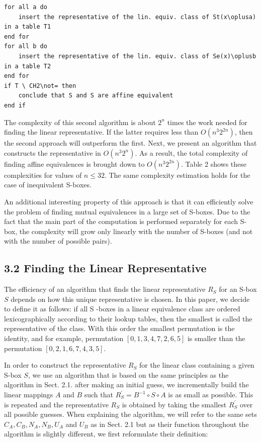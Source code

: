 \documentclass[10pt]{article}
\begin{document}
\begin{verbatim}
for all a do
    insert the representative of the lin. equiv. class of St(x\oplusa) in a table T1
end for
for all b do
    insert the representative of the lin. equiv. class of Se(x)\oplusb in a table T2
end for
if T \ CH2\not= then
    conclude that S and S are affine equivalent
end if
\end{verbatim}

The complexity of this second algorithm is about $2^{n}$ times the work needed for finding the linear representative. If the latter requires less than $O\left(n^{3} 2^{2 n}\right)$, then the second approach will outperform the first. Next, we present an algorithm that constructs the representative in $O\left(n^{3} 2^{n}\right)$. As a result, the total complexity of finding affine equivalences is brought down to $O\left(n^{3} 2^{2 n}\right)$. Table 2 shows these complexities for values of $n \leq 32$. The same complexity estimation holds for the case of inequivalent S-boxes.

An additional interesting property of this approach is that it can efficiently solve the problem of finding mutual equivalences in a large set of S-boxes. Due to the fact that the main part of the computation is performed separately for each S-box, the complexity will grow only linearly with the number of S-boxes (and not with the number of possible pairs).

\subsection*{3.2 Finding the Linear Representative}
The efficiency of an algorithm that finds the linear representative $R_{S}$ for an S-box $S$ depends on how this unique representative is chosen. In this paper, we decide to define it as follows: if all S -boxes in a linear equivalence class are ordered lexicographically according to their lookup tables, then the smallest is called the representative of the class. With this order the smallest permutation is the identity, and for example, permutation $[0,1,3,4,7,2,6,5]$ is smaller than the permutation $[0,2,1,6,7,4,3,5]$.

In order to construct the representative $R_{S}$ for the linear class containing a given S-box $S$, we use an algorithm that is based on the same principles as the algorithm in Sect. 2.1. after making an initial guess, we incrementally build the linear mappings $A$ and $B$ such that $R_{S}^{\prime}=B^{-1} \circ S \circ A$ is as small as possible. This is repeated and the representative $R_{S}$ is obtained by taking the smallest $R_{S}^{\prime}$ over all possible guesses. When explaining the algorithm, we will refer to the same sets $C_{A}, C_{B}, N_{A}, N_{B}, U_{A}$ and $U_{B}$ as in Sect. 2.1 but as their function throughout the algorithm is slightly different, we first reformulate their definition:
\end{document}
